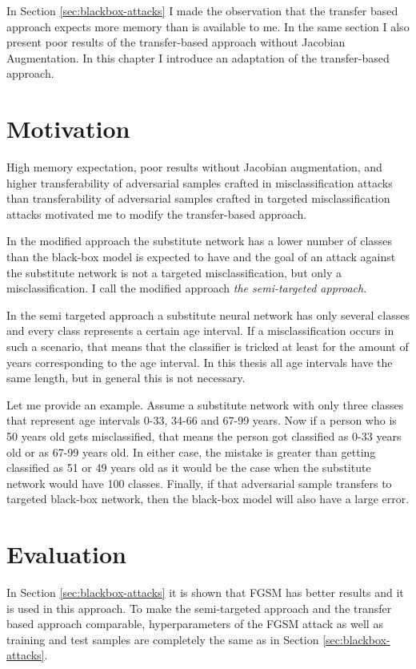 In Section \ref{sec:blackbox-attacks} I made the observation that the transfer based approach expects more memory than is available to me. In the same section I also present poor results of the transfer-based approach without Jacobian Augmentation. In this chapter I introduce an adaptation of the transfer-based approach.

\section{Motivation}
High memory expectation, poor results without Jacobian augmentation, and higher transferability of adversarial samples crafted in misclassification attacks than transferability of adversarial samples crafted in targeted misclassification attacks \cite{ensemble-attack} motivated me to modify the transfer-based approach.

In the modified approach the substitute network has a lower number of classes than the black-box model is expected to have and the goal of an attack against the substitute network is not a targeted misclassification, but only a misclassification. I call the modified approach \textit{the semi-targeted approach}.

In the semi targeted approach a substitute neural network has only several classes and every class represents a certain age interval. If a misclassification occurs in such a scenario, that means that the classifier is tricked at least for the amount of years corresponding to the age interval. In this thesis all age intervals have the same length, but in general this is not necessary.

Let me provide an example. Assume a substitute network with only three classes that represent age intervals 0-33, 34-66 and 67-99 years. Now if a person who is 50 years old gets misclassified, that means the person got classified as 0-33 years old or as 67-99 years old. In either case, the mistake is greater than getting classified as 51 or 49 years old as it would be the case when the substitute network would have 100 classes. Finally, if that adversarial sample transfers to targeted black-box network, then the black-box model will also have a large error.

\section{Evaluation}
In Section \ref{sec:blackbox-attacks} it is shown that FGSM has better results and it is used in this approach. To make the semi-targeted approach and the transfer based approach comparable, hyperparameters of the FGSM attack as well as training and test samples are completely the same as in Section \ref{sec:blackbox-attacks}. 

